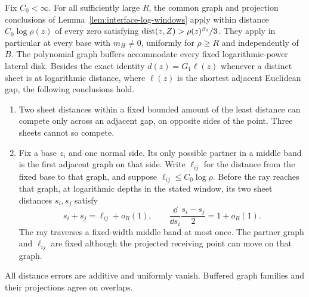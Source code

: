 \begin{lemma}
\label{lem:radial-clean-geometry}
Fix $C_0<\infty$. For all sufficiently large $R$, the common graph and
projection conclusions of Lemma~\ref{lem:interface-log-windows} apply
within distance $C_0\log\rho(z)$ of every zero satisfying
$\operatorname{dist}(z,Z)>\rho(z)^{\beta_0}/3$. They apply in particular at every
base with $m_H\ne0$, uniformly for $\rho\ge R$ and independently of $B$.
The polynomial graph buffers accommodate every fixed logarithmic-power
lateral disk. Besides the exact identity $d(z)=G_1\ell(z)$ whenever a
distinct sheet is at logarithmic distance, where $\ell(z)$ is the
shortest adjacent Euclidean gap, the following conclusions hold.
\begin{enumerate}
 \item Two sheet distances within a fixed bounded amount of the least
 distance can compete only across an adjacent gap, on opposite sides
 of the point. Three sheets cannot so compete.
 \item Fix a base $z_i$ and one normal side. Its only possible partner
 in a middle band is the first adjacent graph on that side. Write
 $\ell_{ij}$ for the distance from the fixed base to that graph, and
 suppose $\ell_{ij}\le C_0\log\rho$. Before the ray reaches that graph,
 at logarithmic depths in the stated window, its two sheet distances
 $s_i,s_j$ satisfy
 \[
 s_i+s_j=\ell_{ij}+o_R(1),\qquad
 \frac{\dd}{\dd s_i}\frac{s_i-s_j}{2}=1+o_R(1).
 \]
 The ray traverses a fixed-width middle band at most once. The partner
 graph and $\ell_{ij}$ are fixed although the projected receiving
 point can move on that graph.
\end{enumerate}
All distance errors are additive and uniformly vanish. Buffered graph
families and their projections agree on overlaps.
\end{lemma}

